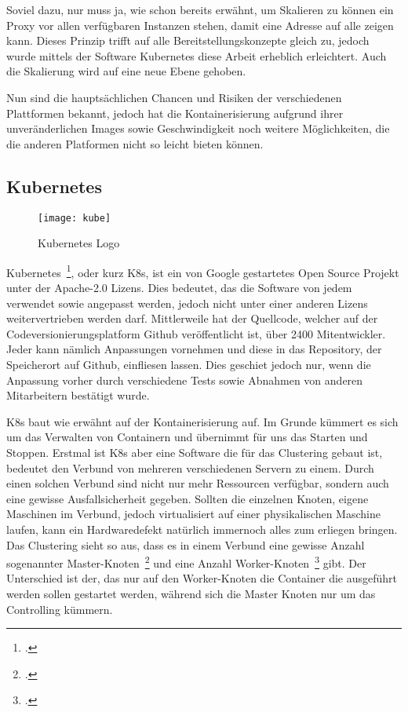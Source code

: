Soviel dazu, nur muss ja, wie schon bereits erwähnt, um Skalieren zu können ein Proxy vor allen verfügbaren Instanzen stehen, damit eine Adresse auf alle zeigen kann.
Dieses Prinzip trifft auf alle Bereitstellungskonzepte gleich zu, jedoch wurde mittels der Software Kubernetes diese Arbeit erheblich erleichtert. Auch die Skalierung
wird auf eine neue Ebene gehoben.

Nun sind die hauptsächlichen Chancen und Risiken der verschiedenen Plattformen bekannt, jedoch hat die Kontainerisierung aufgrund ihrer 
unveränderlichen Images sowie Geschwindigkeit noch weitere Möglichkeiten, die die anderen Platformen nicht so leicht bieten können.

\subsection{Kubernetes}

\begin{figure}[H]
\caption{Kubernetes Logo}
\texttt{[image: kube]}
\\
\cite[][27.03.2020]{Quelle: https://bit.ly/3afiIMv}
\end{figure}

Kubernetes~\footcite[Vgl. ][]{website:kube}, oder kurz K8s, ist ein von Google gestartetes Open Source Projekt unter der Apache-2.0 Lizens. Dies bedeutet, das die Software von jedem verwendet sowie angepasst werden, 
jedoch nicht unter einer anderen Lizens weitervertrieben werden darf. Mittlerweile hat der Quellcode, welcher auf der Codeversionierungsplatform Github veröffentlicht ist, über 2400 Mitentwickler.
Jeder kann nämlich Anpassungen vornehmen und diese in das Repository, der Speicherort auf Github, einfliesen lassen. Dies geschiet jedoch nur, wenn die Anpassung
vorher durch verschiedene Tests sowie Abnahmen von anderen Mitarbeitern bestätigt wurde.

K8s baut wie erwähnt auf der Kontainerisierung auf. Im Grunde kümmert es sich um das Verwalten von Containern und übernimmt für uns das Starten und Stoppen.
Erstmal ist K8s aber eine Software die für das Clustering gebaut ist, bedeutet den Verbund von mehreren verschiedenen Servern zu einem. Durch einen solchen Verbund sind nicht nur mehr Ressourcen verfügbar,
sondern auch eine gewisse Ausfallsicherheit gegeben. Sollten die einzelnen Knoten, eigene Maschinen im Verbund, jedoch virtualisiert auf einer physikalischen Maschine laufen, kann ein Hardwaredefekt natürlich immernoch
alles zum erliegen bringen.
Das Clustering sieht so aus, dass es in einem Verbund eine gewisse Anzahl sogenannter Master-Knoten~\footcite[Vgl. ][]{website:kube-komponenten} und eine Anzahl Worker-Knoten~\footcite[Vgl. ][]{website:kube-komponenten} gibt. Der Unterschied ist der, das nur auf den Worker-Knoten
die Container die ausgeführt werden sollen gestartet werden, während sich die Master Knoten nur um das Controlling kümmern.

